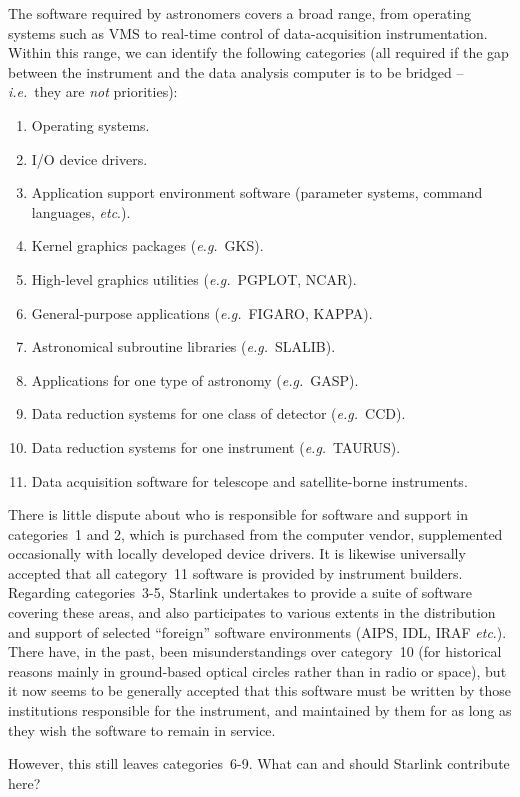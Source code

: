 The software required by astronomers covers a broad range, from
operating systems such as VMS to real-time control of
data-acquisition instrumentation.  Within this range, we
can identify the following categories (all required if the gap between
the instrument and the data analysis computer is to be bridged --
{\it i.e.}\ they are {\it not} priorities):
\begin{enumerate}
\item Operating systems.
\item I/O device drivers.
\item Application support environment software (parameter
      systems, command languages, {\it etc}.).
\item Kernel graphics packages ({\it e.g.}\ GKS).
\item High-level graphics utilities ({\it e.g.}\ PGPLOT, NCAR).
\item General-purpose applications ({\it e.g.}\ FIGARO, KAPPA).
\item Astronomical subroutine libraries ({\it e.g.}\ SLALIB).
\item Applications for one type of astronomy ({\it e.g.}\ GASP).
\item Data reduction systems for one class of detector ({\it e.g.}\ CCD).
\item Data reduction systems for one instrument ({\it e.g.}\ TAURUS).
\item Data acquisition software for telescope and satellite-borne
instruments.
\end{enumerate}
There is little dispute about who is
responsible for software and support in categories~1 and 2, which
is purchased from the computer
vendor, supplemented occasionally with locally developed
device drivers.  It is likewise universally accepted that all
category~11 software is provided by instrument builders.
Regarding categories~3-5, Starlink undertakes to provide a suite
of software covering these areas, and also participates to various extents in
the distribution and support of selected ``foreign'' software
environments (AIPS, IDL, IRAF {\it etc}.).
There have, in the past, been
misunderstandings over category~10 (for historical reasons mainly
in ground-based optical circles rather than in radio or space), but
it now seems to be generally accepted that this software
must be written by those institutions
responsible for the instrument, and maintained
by them for as long as they wish the software to remain in service.

However, this still leaves categories~6-9.  What can and should Starlink
contribute here?

